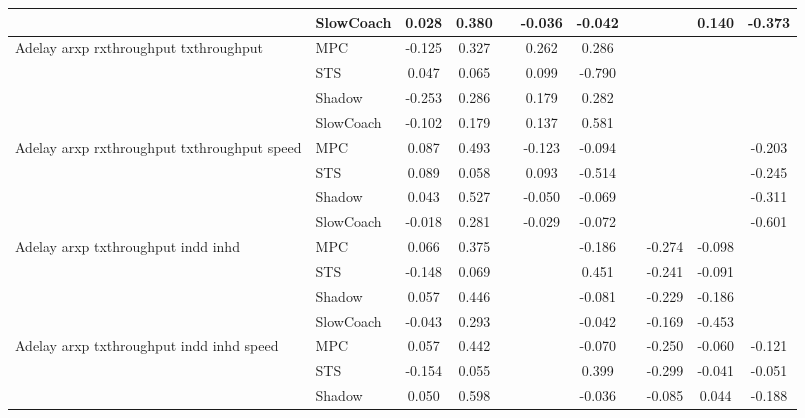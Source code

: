 \begin{tabular}{|l|l|*{9}{c|}}
                              & SlowCoach &    0.028 &     0.380 &        & -0.036 & -0.042 &     &      &   0.140 &   -0.373 \\
\midrule
Adelay arxp rxthroughput txthroughput    & MPC &   -0.125 &     0.327 &        &  0.262 &  0.286 &     &      &      &       \\
                              & STS &    0.047 &     0.065 &        &  0.099 & -0.790 &     &      &      &       \\
                              & Shadow &   -0.253 &     0.286 &        &  0.179 &  0.282 &     &      &      &       \\
                              & SlowCoach &   -0.102 &     0.179 &        &  0.137 &  0.581 &     &      &      &       \\
\midrule
Adelay arxp rxthroughput txthroughput speed    & MPC &    0.087 &     0.493 &        & -0.123 & -0.094 &     &      &      &   -0.203 \\
                              & STS &    0.089 &     0.058 &        &  0.093 & -0.514 &     &      &      &   -0.245 \\
                              & Shadow &    0.043 &     0.527 &        & -0.050 & -0.069 &     &      &      &   -0.311 \\
                              & SlowCoach &   -0.018 &     0.281 &        & -0.029 & -0.072 &     &      &      &   -0.601 \\
\midrule
Adelay arxp txthroughput indd inhd    & MPC &    0.066 &     0.375 &        &     & -0.186 &     &  -0.274 &  -0.098 &       \\
                              & STS &   -0.148 &     0.069 &        &     &  0.451 &     &  -0.241 &  -0.091 &       \\
                              & Shadow &    0.057 &     0.446 &        &     & -0.081 &     &  -0.229 &  -0.186 &       \\
                              & SlowCoach &   -0.043 &     0.293 &        &     & -0.042 &     &  -0.169 &  -0.453 &       \\
\midrule
Adelay arxp txthroughput indd inhd speed    & MPC &    0.057 &     0.442 &        &     & -0.070 &     &  -0.250 &  -0.060 &   -0.121 \\
                              & STS &   -0.154 &     0.055 &        &     &  0.399 &     &  -0.299 &  -0.041 &   -0.051 \\
                              & Shadow &    0.050 &     0.598 &        &     & -0.036 &     &  -0.085 &   0.044 &   -0.188 \\

\end{tabular}
